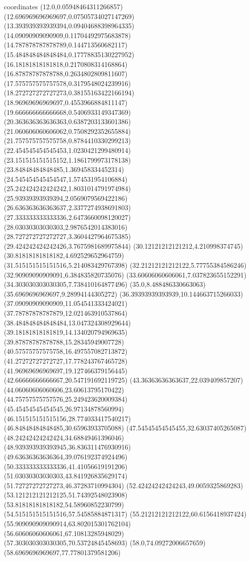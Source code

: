 coordinates {%
(12.0,0.05948464311266857)
(12.696969696969697,0.07505734027147269)
(13.393939393939394,0.09404688398964335)
(14.09090909090909,0.11704492975683878)
(14.787878787878789,0.144713560682117)
(15.484848484848484,0.17778835130227952)
(16.18181818181818,0.2170808314168864)
(16.87878787878788,0.2634802809811607)
(17.575757575757578,0.3179548024239916)
(18.272727272727273,0.38155163422166194)
(18.96969696969697,0.4553966884811147)
(19.666666666666668,0.5406933149347369)
(20.363636363636363,0.6387203133601386)
(21.060606060606062,0.7508292352655884)
(21.757575757575758,0.8784410330299213)
(22.454545454545453,1.0230421299480914)
(23.151515151515152,1.1861799973178138)
(23.84848484848485,1.369458334452314)
(24.545454545454547,1.574531954106884)
(25.242424242424242,1.8031014791974984)
(25.93939393939394,2.0569079569422186)
(26.636363636363637,2.3377274938691803)
(27.333333333333336,2.6473660098120027)
(28.03030303030303,2.9876542014383016)
(28.727272727272727,3.3604427964675385)
(29.424242424242426,3.7675981689975844)
(30.12121212121212,4.210998374745)
(30.81818181818182,4.692529652964759)
(31.515151515151516,5.214083429767398)
(32.21212121212122,5.77755384586246)
(32.90909090909091,6.384835820735076)
(33.60606060606061,7.037823655152291)
(34.303030303030305,7.738410164877496)
(35.0,8.488486330663063)
(35.6969696969697,9.28994144305272)
(36.39393939393939,10.144663715266033)
(37.09090909090909,11.054541333424021)
(37.78787878787879,12.021463910537864)
(38.484848484848484,13.047324308929644)
(39.18181818181819,14.134020794969635)
(39.87878787878788,15.28345949007728)
(40.57575757575758,16.497557082713872)
(41.27272727272727,17.778243767465728)
(41.96969696969697,19.127466379156445)
(42.66666666666667,20.547191692119725)
(43.36363636363637,22.039409857207)
(44.06060606060606,23.60613795170422)
(44.75757575757576,25.249423620009384)
(45.45454545454545,26.97134878560994)
(46.151515151515156,28.774033417540217)
(46.84848484848485,30.65963933705088)
(47.54545454545455,32.63037405265087)
(48.24242424242424,34.68849461396046)
(48.939393939393945,36.836311476930916)
(49.63636363636364,39.076192374924496)
(50.333333333333336,41.41056619191206)
(51.03030303030303,43.841926835629174)
(51.72727272727273,46.37283710994304)
(52.42424242424243,49.0059325869283)
(53.121212121212125,51.74392548023908)
(53.81818181818182,54.58960852230799)
(54.515151515151516,57.54585884871317)
(55.21212121212122,60.6156418937424)
(55.909090909090914,63.802015301762104)
(56.60606060606061,67.10813285948029)
(57.303030303030305,70.53724845458693)
(58.0,74.09272006657659)
(58.6969696969697,77.77801379581206)
}

